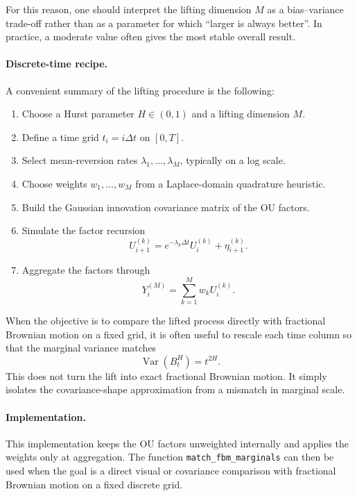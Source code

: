 \documentclass[a4paper,10pt,titlepage,oneside,openany]{book}
\theoremstyle{plain}
\theoremstyle{definition}
\theoremstyle{remark}
\newcommand{\Var}{\operatorname{Var}}
\newcommand{\1}{\mathbf{1}}
\begin{document}
For this reason, one should interpret the lifting dimension \(M\) as a bias--variance trade-off rather than as a parameter for which ``larger is always better''. In practice, a moderate value often gives the most stable overall result.

\paragraph{Discrete-time recipe.}

A convenient summary of the lifting procedure is the following:

\begin{enumerate}[label=\arabic*.]
    \item Choose a Hurst parameter \(H\in(0,1)\) and a lifting dimension \(M\).
    \item Define a time grid \(t_i=i\Delta t\) on \([0,T]\).
    \item Select mean-reversion rates \(\lambda_1,\dots,\lambda_M\), typically on a log scale.
    \item Choose weights \(w_1,\dots,w_M\) from a Laplace-domain quadrature heuristic.
    \item Build the Gaussian innovation covariance matrix of the OU factors.
    \item Simulate the factor recursion
    \[
    U_{i+1}^{(k)}=e^{-\lambda_k\Delta t}U_i^{(k)}+\eta_{i+1}^{(k)}.
    \]
    \item Aggregate the factors through
    \[
    Y_i^{(M)}=\sum_{k=1}^M w_k U_i^{(k)}.
    \]
\end{enumerate}

When the objective is to compare the lifted process directly with fractional Brownian motion on a fixed grid, it is often useful to rescale each time column so that the marginal variance matches
\[
\Var(B_t^H)=t^{2H}.
\]
This does not turn the lift into exact fractional Brownian motion. It simply isolates the covariance-shape approximation from a mismatch in marginal scale.

\paragraph{Implementation.}

This implementation keeps the OU factors unweighted internally and applies the weights only at aggregation. The function \texttt{match\_fbm\_marginals} can then be used when the goal is a direct visual or covariance comparison with fractional Brownian motion on a fixed discrete grid.
\end{document}

